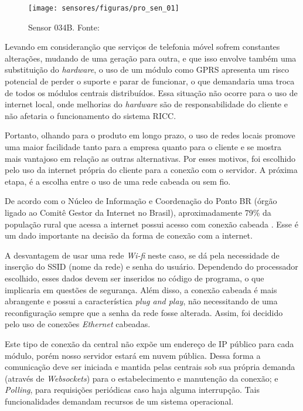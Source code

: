 \begin{figure}
	\centering
	\texttt{[image: sensores/figuras/pro\_sen\_01]}
	\caption{Sensor 034B. Fonte: \cite{bib_proc_vic_02}}
	\label{ele_prc_vic_01}
\end{figure}

Levando em consideranção que serviços de telefonia móvel sofrem constantes alterações, mudando de uma geração para outra, e que isso envolve também uma substituição do \emph{hardware}, o uso de um módulo como GPRS apresenta um risco potencial de perder o suporte e parar de funcionar, o que demandaria uma troca de todos os módulos centrais distribuídos. Essa situação não ocorre para o uso de internet local, onde melhorias do \emph{hardware} são de responsabilidade do cliente e não afetaria o funcionamento do sistema RICC. 

Portanto, olhando para o produto em longo prazo, o uso de redes locais promove uma maior facilidade tanto para a empresa quanto para o cliente e se mostra mais vantajoso em relação as outras alternativas. Por esses motivos, foi escolhido pelo uso da internet própria do cliente para a conexão com o servidor. A próxima etapa, é a escolha entre o uso de uma rede cabeada ou sem fio.

De acordo com o Núcleo de Informação e Coordenação do Ponto BR (órgão ligado ao Comitê Gestor da Internet no Brasil), aproximadamente 79\% da população rural que acessa a internet possui acesso com conexão cabeada \cite{bib_sen_gab_03}. Esse é um dado importante na decisão da forma de conexão com a internet. 

A desvantagem de usar uma rede \emph{Wi-fi} neste caso, se dá pela necessidade de inserção do SSID (nome da rede) e senha do usuário. Dependendo do processador escolhido, esses dados devem ser inseridos no código de programa, o que implicaria em questões de segurança. Além disso, a conexão cabeada é mais abrangente e possui a característica \emph{plug and play}, não necessitando de uma reconfiguração sempre que a senha da rede fosse alterada. Assim, foi decidido pelo uso de conexões \emph{Ethernet} cabeadas.

Este tipo de conexão da central não expõe um endereço de IP público para cada módulo, porém nosso servidor estará em nuvem pública. Dessa forma a comunicação deve ser iniciada e mantida pelas centrais sob sua própria demanda (através de \emph{Websockets}) para o estabelecimento e manutenção da conexão; e \emph{Polling}, para requisições periódicas caso haja alguma interrupção. Tais funcionalidades demandam recursos de um sistema operacional.


